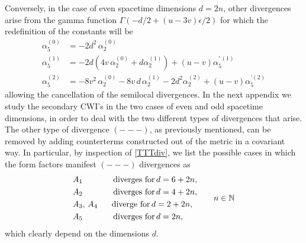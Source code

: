 \documentclass[a4paper,11pt,openright,twoside]{book}
\let\a=\alpha   \let\b=\beta   \let\g=\gamma   \let\d=\delta
\let\e=\epsilon \let\z=\zeta   \let\h=\eta     \let\q=\theta
\numberwithin{equation}{section}
\begin{document}
{{{Conversely, in the case of even spacetime dimensions $d=2n$, other divergences arise from the gamma function $\Gamma(-d/2+(u-3v)\e/2)$ for which the redefinition of the constants will be
\begin{equation}
	\begin{split}
		\a_5^{(0)}&=-2d^2\,\a_2^{(0)}\\
		\a_5^{(1)}&=-2d\left(4v\,\a_2^{(0)}+d\a_2^{(1)}\right)+(u-v)\a_5^{\prime\,(1)}\\
		\a_5^{(2)}&=-8v^2\,\a_2^{(0)}-8v\,d\,\a_2^{(1)}-2d^2\a_2^{(2)}+(u-v)\a_5^{\prime(2)}
	\end{split}\label{redef2}
\end{equation}
allowing the cancellation of the semilocal divergences. 
In the next appendix we study the secondary CWI's in the two cases of even and odd spacetime dimensions, in order to deal with the two different types of divergences that arise.  
The other type of divergence $(---)$, as previously mentioned, can be removed by adding counterterms constructed out of the metric in a covariant way. In particular, by inspection of \eqref{TTTdiv}, we list the possible cases in which the form factors manifest $(---)$ divergences as
\begin{equation}
	\begin{split}
		&A_1\hspace{1.3cm}\text{diverges for} \,d=6+2n,\\
		&A_2\hspace{1.3cm}\text{diverges for} \,d=4+2n,\\
		&A_3,\,A_4 \hspace{0.6cm}\text{diverge for} \,d=2+2n,\\
		&A_5 \hspace{1.3cm}\text{diverges for} \,d=2n,
	\end{split}\qquad n\in\mathbb{N} \label{divFormFactor}
\end{equation}
which clearly depend on the dimensions $d$. 
}
}}
\end{document}
